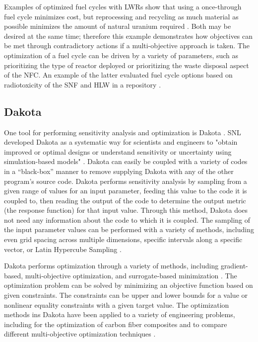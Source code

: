Examples of optimized fuel cycles with \glspl{LWR} show that using a
once-through fuel cycle minimizes cost, but reprocessing and recycling as 
much material as possible minimizes the amount of natural uranium 
required \cite{kunsch_nuclear_1987}. Both may 
be desired at the same time; therefore this example demonstrates how 
objectives can be met through contradictory actions if a multi-objective 
approach is taken. The optimization of a fuel cycle can be driven 
by a variety of parameters, such as prioritizing the type of reactor 
deployed or prioritizing the waste disposal 
aspect of the \gls{NFC}. An example of the latter 
evaluated fuel cycle options based on radiotoxicity of the \gls{SNF} and 
\gls{HLW} in a repository \cite{del_cul_advanced_2010}. 


\subsection{Dakota}
One tool for performing sensitivity analysis and optimization is 
Dakota \cite{adams_dakota_2021}.
\gls{SNL} developed Dakota as a systematic way for scientists and 
engineers to "obtain improved or optimal designs or understand sensitivity
or uncertainty using simulation-based models" \cite{adams_dakota_2021}.
Dakota can easily be coupled with a variety of codes in a ``black-box'' 
manner
to remove supplying Dakota with any of the other program's source code.
Dakota performs sensitivity analysis by sampling from a given range of 
values for an input parameter, feeding this value to the code it is 
coupled to, then reading the output of the code to determine the output 
metric (the response function) for that input value. Through this method, 
Dakota does not need any information about the code to which it is coupled. 
The sampling of the input parameter values can be performed with a variety of 
methods, including even grid spacing across multiple dimensions, specific 
intervals along a specific vector, or Latin Hypercube Sampling 
\cite{adams_dakota_2021}.

Dakota performs optimization through a variety of methods, including
gradient-based, multi-objective optimization, and surrogate-based 
minimization \cite{adams_dakota_2021}. The optimization problem can be 
solved by minimizing an objective function based on given constraints. The 
constraints can be upper and lower bounds for a value or nonlinear 
equality constraints with a given target value. The optimization 
methods ins Dakota have been applied to a variety of engineering problems,
including for the optimization of carbon fiber composites 
\cite{skulborstad_multi-objective_2018} and to compare different 
multi-objective optimization techniques \cite{chiandussi_comparison_2012}. 

